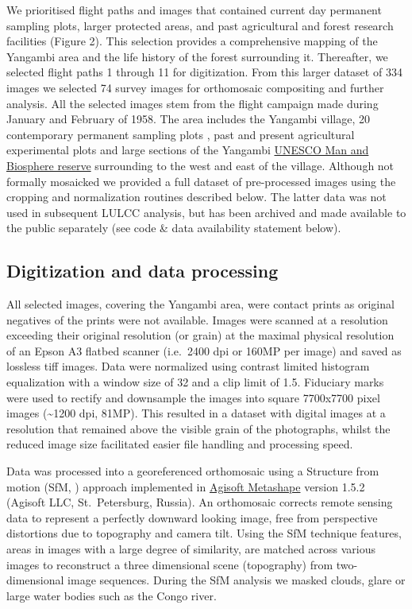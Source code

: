 \documentclass[remote sensing,article,submit,moreauthors,pdftex,10pt,a4paper]{mdpi}
\begin{document}
We prioritised flight paths and images that contained current day
permanent sampling plots, larger protected areas, and past agricultural
and forest research facilities (Figure 2). This selection provides a
comprehensive mapping of the Yangambi area and the life history of the
forest surrounding it. Thereafter, we selected flight paths 1 through 11
for digitization. From this larger dataset of 334 images we selected 74
survey images for orthomosaic compositing and further analysis. All the
selected images stem from the flight campaign made during January and
February of 1958. The area includes the Yangambi village, 20
contemporary permanent sampling plots \citep{Kearsley2013}, past and
present agricultural experimental plots \citep{bauters2015} and large
sections of the Yangambi
\href{http://www.unesco.org/new/en/natural-sciences/environment/ecological-sciences/biosphere-reserves/africa/democratic-republic-of-the-congo/yangambi/}{UNESCO
Man and Biosphere reserve} surrounding to the west and east of the
village. Although not formally mosaicked we provided a full dataset of
pre-processed images using the cropping and normalization routines
described below. The latter data was not used in subsequent LULCC
analysis, but has been archived and made available to the public
separately (see code \& data availability statement below).

\hypertarget{digitization-and-data-processing}{%
\subsection{Digitization and data
processing}\label{digitization-and-data-processing}}

All selected images, covering the Yangambi area, were contact prints as
original negatives of the prints were not available. Images were scanned
at a resolution exceeding their original resolution (or grain) at the
maximal physical resolution of an Epson A3 flatbed scanner (i.e.~2400
dpi or 160MP per image) and saved as lossless tiff images. Data were
normalized using contrast limited histogram equalization
\citep{zuiderveld1994} with a window size of 32 and a clip limit of 1.5.
Fiduciary marks were used to rectify and downsample the images into
square 7700x7700 pixel images (\textasciitilde{}1200 dpi, 81MP). This
resulted in a dataset with digital images at a resolution that remained
above the visible grain of the photographs, whilst the reduced image
size facilitated easier file handling and processing speed.

Data was processed into a georeferenced orthomosaic using a Structure
from motion (SfM, \citet{ullman1979}) approach implemented in
\href{http://www.agisoft.com}{Agisoft Metashape} version 1.5.2 (Agisoft
LLC, St.~Petersburg, Russia). An orthomosaic corrects remote sensing
data to represent a perfectly downward looking image, free from
perspective distortions due to topography and camera tilt. Using the SfM
technique features, areas in images with a large degree of similarity,
are matched across various images to reconstruct a three dimensional
scene (topography) from two-dimensional image sequences. During the SfM
analysis we masked clouds, glare or large water bodies such as the Congo
river.
\end{document}
